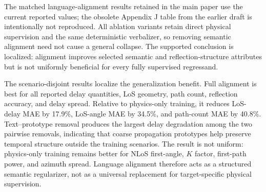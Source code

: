 The matched language-alignment results retained in the main paper use the current reported values;
the obsolete Appendix J table from the earlier draft is intentionally not reproduced. All ablation
variants retain direct physical supervision and the same deterministic verbalizer, so removing
semantic alignment need not cause a general collapse. The supported conclusion is localized:
alignment improves selected semantic and reflection-structure attributes but is not uniformly beneficial
for every fully supervised regressand.

The scenario-disjoint results localize the generalization benefit. Full alignment is best for all
reported delay quantities, LoS geometry, path count, reflection accuracy, and delay spread. Relative
to physics-only training, it reduces LoS-delay MAE by 17.9\%, LoS-angle MAE by 34.5\%, and
path-count MAE by 40.8\%. Text--prototype removal produces the largest delay degradation among the
two pairwise removals, indicating that coarse propagation prototypes help preserve temporal structure
outside the training scenarios. The result is not uniform: physics-only training remains better for
NLoS first-angle, $K$ factor, first-path power, and azimuth spread. Language alignment therefore acts
as a structured semantic regularizer, not as a universal replacement for target-specific physical
supervision.

